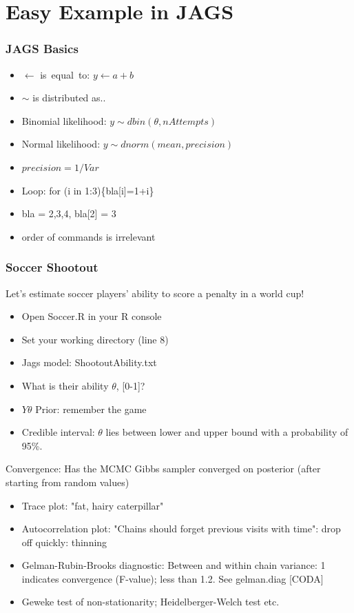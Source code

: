 \documentclass[hyperref={pdfpagelabels=false},unknownkeysallowed]{beamer}
\begin{document}
\section{Easy Example in JAGS}

\begin{frame}
	\frametitle{JAGS Basics}
	\begin{itemize}
	    \item $\leftarrow$ is~equal~to: $y \leftarrow a+b$
	    \item $\sim$ is distributed as..
	    \item Binomial likelihood: $y \sim dbin(\theta,nAttempts)$
		\item Normal likelihood: $ y \sim dnorm(mean,precision)$
		\item $precision = 1/ Var$
		\item Loop: for (i in 1:3)\{bla[i]=1+i\}
		\item bla = 2,3,4, bla[2] = 3
		\item order of commands is irrelevant
	\end{itemize} 
	\note{}
\end{frame}

\begin{frame}
\frametitle{Soccer Shootout}
Let's estimate soccer players' ability to score a penalty in a world cup! 
\begin{itemize}
\item Open Soccer.R in your R console
\item Set your working directory (line 8)
\item Jags model: ShootoutAbility.txt
\item What is their ability $\theta$, [0-1]?
\item $Y\theta$ Prior: remember the game
\item Credible interval: $\theta$ lies between lower and upper bound  with a probability of 95\%. 
\end{itemize}
\note{}
\end{frame}


\begin{frame}
Convergence: Has the MCMC Gibbs sampler converged on posterior (after starting from random values)
\begin{itemize}
\item Trace plot: "fat, hairy caterpillar"
\item Autocorrelation plot: "Chains should forget previous visits with time": drop off quickly: thinning
\item Gelman-Rubin-Brooks diagnostic: Between and within chain variance: 1 indicates convergence (F-value); less than 1.2. See gelman.diag [CODA]
\item Geweke test of non-stationarity; Heidelberger-Welch test etc.
\end{itemize}
\note{}
\end{frame}
\end{document}

